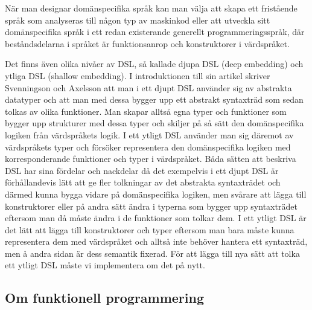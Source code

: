 \documentclass[]{article}
\begin{document}
När man designar domänspecifika språk kan man välja att skapa ett fristående
språk som analyseras till någon typ av maskinkod eller att utveckla sitt
domänspecifika språk i ett redan existerande generellt programmeringsspråk,
där beståndsdelarna i språket är funktionsanrop och konstruktorer i värdspråket.

Det finns även olika nivåer av DSL, så kallade djupa DSL (deep embedding) och
ytliga DSL (shallow embedding). I introduktionen till sin artikel skriver
Svenningson och Axelsson \cite{Svenningsson2013} att man i ett djupt
DSL använder sig av abstrakta datatyper och att man med dessa bygger upp ett
abstrakt syntaxträd som sedan tolkas av olika funktioner.
Man skapar alltså egna typer och funktioner som bygger upp strukturer med dessa
typer och skiljer på så sätt den domänspecifika logiken från värdspråkets logik.
I ett ytligt DSL använder man sig däremot av värdspråkets typer och försöker
representera den domänspecifika logiken med korresponderande funktioner och
typer i värdspråket.
Båda sätten att beskriva DSL har sina fördelar och nackdelar då det exempelvis
i ett djupt DSL är förhållandevis lätt att ge fler tolkningar av det abstrakta
syntaxträdet och därmed kunna bygga vidare på domänspecifika logiken,
men svårare att lägga till konstruktorer eller på andra sätt ändra i typerna som
bygger upp syntaxträdet eftersom man då måste ändra i de funktioner som tolkar
dem. I ett ytligt DSL är det lätt att lägga till konstruktorer och typer
eftersom man bara måste kunna representera dem med värdspråket och alltså inte
behöver hantera ett syntaxträd, men å andra sidan är dess semantik fixerad.
För att lägga till nya sätt att tolka ett ytligt DSL måste vi implementera
om det på nytt.

\subsection{Om funktionell programmering}
\end{document}
